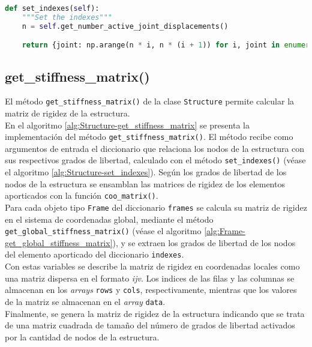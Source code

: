 \begin{lstlisting}[language=Python,caption=Método \texttt{set\_indexes()} de la clase \texttt{Structure}.,label=alg:Structure-set_indexes, frame=single]
def set_indexes(self):
    """Set the indexes"""
    n = self.get_number_active_joint_displacements()

    return {joint: np.arange(n * i, n * (i + 1)) for i, joint in enumerate(self.joints.values())}
\end{lstlisting}

\subsection{get\_stiffness\_matrix()}

El método \verb|get_stiffness_matrix()| de la clase \verb|Structure| permite calcular la matriz de rigidez de la estructura.\\

En el algoritmo \ref{alg:Structure-get_stiffness_matrix} se presenta la implementación del método \verb|get_stiffness_matrix()|. El método recibe como argumentos de entrada el diccionario que relaciona los nodos de la estructura con sus respectivos grados de libertad, calculado con el método \verb|set_indexes()| (véase el algoritmo \ref{alg:Structure-set_indexes}). Según los grados de libertad de los nodos de la estructura se ensamblan las matrices de rigidez de los elementos aporticados con la función \verb|coo_matrix()|.\\

Para cada objeto tipo \verb|Frame| del diccionario \verb|frames| se calcula su matriz de rigidez en el sistema de coordenadas global, mediante el método \verb|get_global_stiffness_matrix()| (véase el algoritmo \ref{alg:Frame-get_global_stiffness_matrix}), y se extraen los grados de libertad de los nodos del elemento aporticado del diccionario \verb|indexes|.\\

Con estas variables se describe la matriz de rigidez en coordenadas locales como una matriz dispersa en el formato \emph{ijv}. Los indices de las filas y las columnas se almacenan en los \emph{arrays} \verb|rows| y \verb|cols|, respectivamente, mientras que los valores de la matriz se almacenan en el \emph{array} \verb|data|.\\

Finalmente, se genera la matriz de rigidez de la estructura indicando que se trata de una matriz cuadrada de tamaño del número de grados de libertad activados por la cantidad de nodos de la estructura.\\

